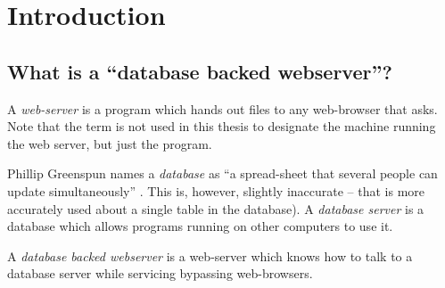 
\chapter{Introduction}





\section{What is a ``database backed webserver''?}

A \textit{web-server} is a program which hands out files to any
web-browser that asks.  Note that the term is not used in this thesis
to designate the machine running the web server, but just the program.

Phillip Greenspun names a \textit{database} as ``a spread-sheet that
several people can update simultaneously''
\cite{phillipandalexsguidetowebpublishing}.  This is, however,
slightly inaccurate -- that is more accurately used about a single
table in the database).  A \textit{database server} is a database
which allows programs running on other computers to use it.

A \textit{database backed webserver} is a web-server which knows how
to talk to a database server while servicing bypassing web-browsers.








